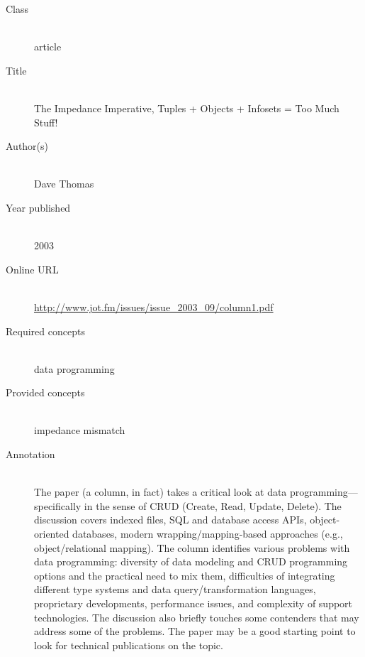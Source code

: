 \begin{description}
\item[Class]\mbox{}\\
article
\item[Title]\mbox{}\\
The Impedance Imperative, Tuples + Objects + Infosets = Too Much Stuff!
\item[Author(s)]\mbox{}\\
Dave Thomas\item[Year published]\mbox{}\\
2003
\item[Online URL]\mbox{}\\
{\footnotesize\url{http://www.jot.fm/issues/issue_2003_09/column1.pdf}}
\item[Required concepts]\mbox{}\\
data programming\item[Provided concepts]\mbox{}\\
impedance mismatch\item[Annotation]\mbox{}\\
The paper (a column, in fact) takes a critical look at data programming---specifically in the sense of CRUD (Create, Read, Update, Delete). The discussion covers indexed files, SQL and database access APIs, object-oriented databases, modern wrapping/mapping-based approaches (e.g., object/relational mapping). The column identifies various problems with data programming: diversity of data modeling and CRUD programming options and the practical need to mix them, difficulties of integrating different type systems and data query/transformation languages, proprietary developments, performance issues, and complexity of support technologies. The discussion also briefly touches some contenders that may address some of the problems. The paper may be a good starting point to look for technical publications on the topic.
\end{description}

